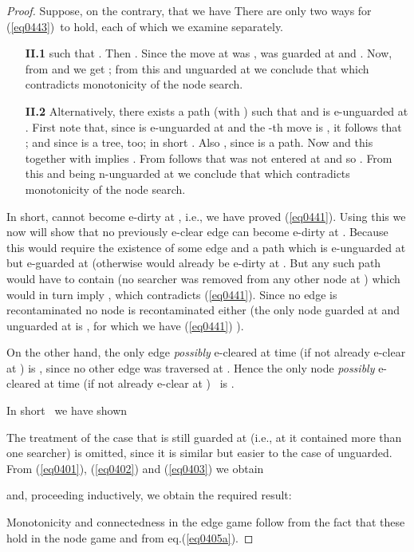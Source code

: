\documentclass[11pt]{article}\usepackage{amsmath}
\begin{document}
\begin{proof}
Suppose, on the contrary, that we have
There are only two ways for (\ref{eq0443})\ to hold, each of which we examine separately.

\begin{enumerate}
\item[\textbf{II.1}]  such that . Then . Since the move at
 was ,  was guarded at  and . Now, from  and  we get
; from this and  unguarded at 
we conclude that  which contradicts
monotonicity of the node search.

\item[\textbf{II.2}] Alternatively, there exists a path  (with ) such that  and  is e-unguarded at
. First note that, since  is e-unguarded at  and the
-th move is , it follows that
; and since  is a
tree,  too; in short .
Also , since  is a
path. Now
and this together with  implies
. From
 follows that  was not entered at  and so
. From this and 
being n-unguarded at  we conclude that  which contradicts monotonicity of the node search.
\end{enumerate}

In short,  cannot become e-dirty at , i.e., we have proved
(\ref{eq0441}). Using this we now will show that no previously e-clear edge
 can become e-dirty at . Because this would require the existence of
some edge  and a path  which is e-unguarded at  but e-guarded at 
(otherwise  would already be e-dirty at . But any such path would have
to contain  (no searcher was removed from any other node at ) which
would in turn imply , which contradicts
(\ref{eq0441}). Since no edge is recontaminated no node is recontaminated
either (the only node guarded at  and unguarded at  is , for which
we have (\ref{eq0441}) ).

On the other hand, the only edge \emph{possibly }e-cleared at time  (if
not already e-clear at ) is , since no other edge was traversed at
. Hence the only node \emph{possibly }e-cleared at time  (if not
already e-clear at ) \ is .

In short \ we have shown

The treatment of the case that  is still guarded at  (i.e., at  it
contained more than one searcher) is omitted, since it is similar but easier
to the case of  unguarded. \medskip From \noindent(\ref{eq0401}),
(\ref{eq0402}) and (\ref{eq0403}) we obtain

and, proceeding inductively, we obtain the required result:

Monotonicity and connectedness in the edge game follow from the fact that
these hold in the node game and from eq.(\ref{eq0405a}).
\end{proof}
\end{document}
